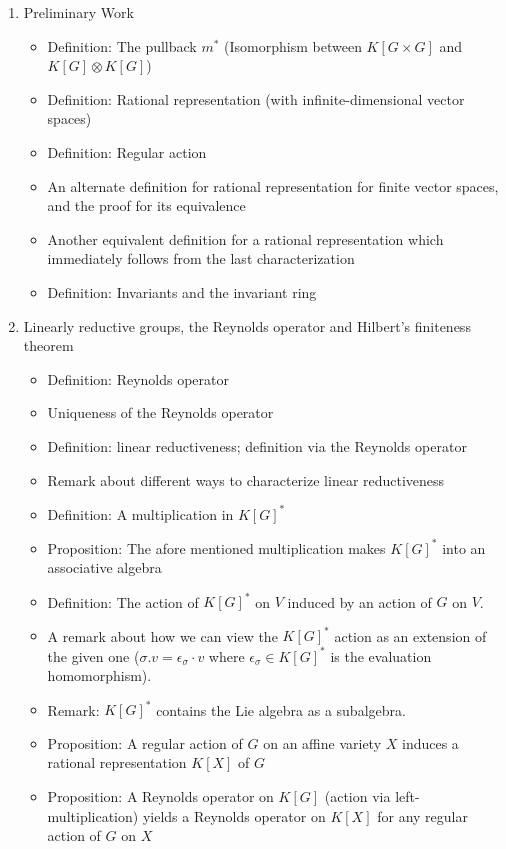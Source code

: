 \documentclass{article}
\begin{document}
\begin{enumerate}
\item Preliminary Work
  \begin{itemize}
  \item Definition:  The pullback $m^\ast$ (Isomorphism between $K[G \times G]$ and $K[G] \otimes K[G]$)
  \item Definition:  Rational representation (with infinite-dimensional vector spaces)
  \item Definition:  Regular action
  \item An alternate definition for rational representation for finite vector spaces, and the proof for its equivalence
  \item Another equivalent definition for a rational representation which immediately follows from the last characterization
  \item Definition:  Invariants and the invariant ring
  \end{itemize}
\item Linearly reductive groups, the Reynolds operator and Hilbert's finiteness theorem
  \begin{itemize}
  \item Definition:  Reynolds operator
  \item Uniqueness of the Reynolds operator
  \item Definition:  linear reductiveness; definition via the Reynolds operator
  \item Remark about different ways to characterize linear reductiveness
  \item Definition:  A multiplication in $K[G]^\ast$
  \item Proposition:  The afore mentioned multiplication makes $K[G]^\ast$ into an associative algebra
  \item Definition:  The action of $K[G]^\ast$ on $V$ induced by an action of $G$ on $V$.
  \item A remark about how we can view the $K[G]^\ast$ action as an extension of the given one ($\sigma . v = \epsilon_\sigma \cdot v$ where $\epsilon_\sigma \in K[G]^\ast$ is the evaluation homomorphism).
  \item Remark:  $K[G]^\ast$ contains the Lie algebra as a subalgebra.
  \item Proposition:  A regular action of $G$ on an affine variety $X$ induces a rational representation $K[X]$ of $G$
  \item Proposition:  A Reynolds operator on $K[G]$ (action via left-multiplication) yields a Reynolds operator on $K[X]$ for any regular action of $G$ on $X$

\end{itemize}
\end{enumerate}
\end{document}

